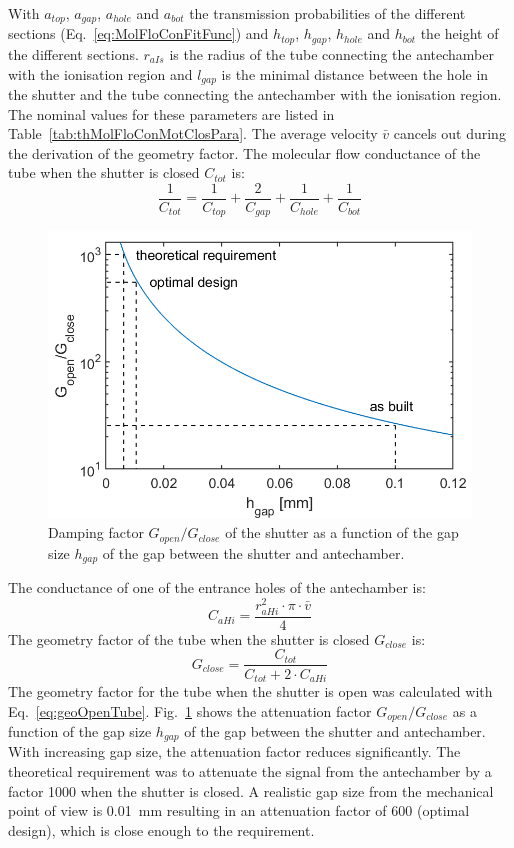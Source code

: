 	With $a_{top}$, $a_{gap}$, $a_{hole}$ and $a_{bot}$ the transmission probabilities of the different sections (Eq.~\eqref{eq:MolFloConFitFunc}) and $h_{top}$, $h_{gap}$, $h_{hole}$ and $h_{bot}$ the height of the different sections. $r_{aIs}$ is the radius of the tube connecting the antechamber with the ionisation region and $l_{gap}$ is the minimal distance between the hole in the shutter and the tube connecting the antechamber with the ionisation region. The nominal values for these parameters are listed in Table~\ref{tab:thMolFloConMotClosPara}. The average velocity $\bar{v}$ cancels out during the derivation of the geometry factor. The molecular flow conductance of the tube when the shutter is closed $C_{tot}$ is:
	\begin{equation}
		\frac{1}{C_{tot}} = \frac{1}{C_{top}} + \frac{2}{C_{gap}} + \frac{1}{C_{hole}} + \frac{1}{C_{bot}}
	\end{equation}
	\begin{figure}[H]
	\centering
		\includegraphics[width=.8\textwidth]{Bilder/Motor_1p2mm.png}
		\caption{Damping factor $G_{open}/G_{close}$ of the shutter as a function of the gap size $h_{gap}$ of the gap between the shutter and antechamber.}
		\label{fig:ShutGapSizeSigDamp}
	\end{figure}
	The conductance of one of the entrance holes of the antechamber is:
	\begin{equation}
		C_{aHi} = \frac{r_{aHi}^2\cdot\pi\cdot\bar{v}}{4}
	\end{equation}
	The geometry factor of the tube when the shutter is closed $G_{close}$ is:
	\begin{equation}
		G_{close} = \frac{C_{tot}}{C_{tot} + 2\cdot C_{aHi}}
	\end{equation}
	The geometry factor for the tube when the shutter is open was calculated with Eq.~\eqref{eq:geoOpenTube}. Fig.~\ref{fig:ShutGapSizeSigDamp} shows the attenuation factor $G_{open}/G_{close}$ as a function of the gap size $h_{gap}$ of the gap between the shutter and antechamber. With increasing gap size, the attenuation factor reduces significantly. The theoretical requirement was to attenuate the signal from the antechamber by a factor 1000 when the shutter is closed. A realistic gap size from the mechanical point of view is 0.01~mm resulting in an attenuation factor of 600 (optimal design), which is close enough to the requirement.\\
